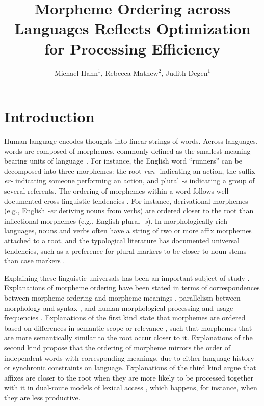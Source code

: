 \documentclass[man]{apa7}
\title{Morpheme Ordering across Languages Reflects Optimization for Processing Efficiency}
\author{Michael Hahn$^1$, Rebecca Mathew$^2$, Judith Degen$^1$}
\affiliation{$^1$ Department of Linguistics, Stanford University, $^2$ Brown University}
\newcommand{\citep}{\parencite}
\begin{document}
\maketitle


\section{Introduction}

Human language encodes thoughts into linear strings of words.
Across languages, words are composed of morphemes, commonly defined as the smallest meaning-bearing units of language~\citep{courtenay1895attempt,bloomfield1926a,katamba2006morphology}.
For instance, the English word ``runners'' can be decomposed into three morphemes: the root \textit{run-} indicating an action, the suffix \textit{-er-} indicating someone performing an action, and plural \textit{-s} indicating a group of several referents.
The ordering of morphemes within a word follows well-documented cross-linguistic tendencies \citep{greenberg1963universals, bybee-morphology-1985, baker1985the}. For instance, derivational morphemes (e.g., English \textit{-er} deriving nouns from verbs) are ordered closer to the root than inflectional morphemes (e.g., English plural \textit{-s}).
%
%
In morphologically rich languages, nouns and verbs often have a string of two or more affix morphemes attached to a root, and the typological literature has documented universal tendencies, such as a preference for plural markers to be closer to noun stems than case markers \citep{greenberg1963universals,bybee-morphology-1985}. 

Explaining these linguistic universals has been an important subject of study \citep{bybee-morphology-1985, spencer2006linguistic, manova2010modeling, bauer2010an, rice2011principles,hay2004what}.
Explanations of morpheme ordering have been stated in terms of correspondences between morpheme ordering and morpheme meanings \citep{bybee-morphology-1985,rice2000morpheme,saldana2021cross}, parallelism between morphology and syntax \citep{givon1971historical,venneman1973explanation,baker1985the}, and human morphological processing and usage frequencies \citep{hay2002speech, plag2002the, inkelas2016affix}.
Explanations of the first kind state that morphemes are ordered based on differences in semantic scope \citep{rice2000morpheme} or relevance \citep{bybee-morphology-1985}, such that morphemes that are more semantically similar to the root occur closer to it.
Explanations of the second kind propose that the ordering of morpheme mirrors the order of independent words with corresponding meanings, due to either language history or synchronic constraints on language.
Explanations of the third kind argue that affixes are closer to the root when they are more likely to be processed together with it in dual-route models of lexical access \citep{baayen-frequency-1993}, which happens, for instance, when they are less productive.
\end{document}
